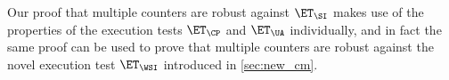 Our proof that multiple counters are robust against $\ET_{\SI}$ makes use 
of the properties of the execution tests $\ET_{\CP}$ and $\ET_{\UA}$ individually, and in fact the same proof can 
be used to prove that multiple counters are robust against the novel execution test $\ET_{\WSI}$ 
introduced in \cref{sec:new_cm}. 


